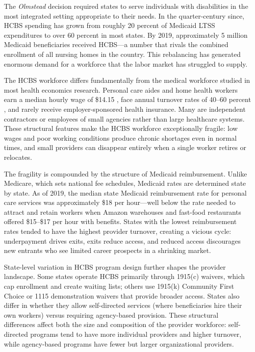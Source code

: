 \documentclass[12pt]{article}
\begin{document}
The \emph{Olmstead} decision required states to serve individuals with disabilities in the most integrated setting appropriate to their needs. In the quarter-century since, HCBS spending has grown from roughly 20 percent of Medicaid LTSS expenditures to over 60 percent in most states. By 2019, approximately 5 million Medicaid beneficiaries received HCBS---a number that rivals the combined enrollment of all nursing homes in the country. This rebalancing has generated enormous demand for a workforce that the labor market has struggled to supply.

The HCBS workforce differs fundamentally from the medical workforce studied in most health economics research. Personal care aides and home health workers earn a median hourly wage of \$14.15 \citep{bls2023hcbs}, face annual turnover rates of 40--60 percent \citep{phi2023turnover}, and rarely receive employer-sponsored health insurance. Many are independent contractors or employees of small agencies rather than large healthcare systems. These structural features make the HCBS workforce exceptionally fragile: low wages and poor working conditions produce chronic shortages even in normal times, and small providers can disappear entirely when a single worker retires or relocates.

The fragility is compounded by the structure of Medicaid reimbursement. Unlike Medicare, which sets national fee schedules, Medicaid rates are determined state by state. As of 2019, the median state Medicaid reimbursement rate for personal care services was approximately \$18 per hour---well below the rate needed to attract and retain workers when Amazon warehouses and fast-food restaurants offered \$15--\$17 per hour with benefits. States with the lowest reimbursement rates tended to have the highest provider turnover, creating a vicious cycle: underpayment drives exits, exits reduce access, and reduced access discourages new entrants who see limited career prospects in a shrinking market.

State-level variation in HCBS program design further shapes the provider landscape. Some states operate HCBS primarily through 1915(c) waivers, which cap enrollment and create waiting lists; others use 1915(k) Community First Choice or 1115 demonstration waivers that provide broader access. States also differ in whether they allow self-directed services (where beneficiaries hire their own workers) versus requiring agency-based provision. These structural differences affect both the size and composition of the provider workforce: self-directed programs tend to have more individual providers and higher turnover, while agency-based programs have fewer but larger organizational providers.
\end{document}
